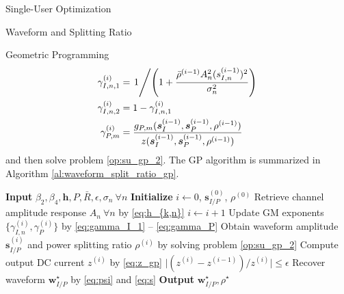 \documentclass{IEEEtran}
\begin{document}
\begin{section}{Single-User Optimization}
\begin{subsection}{Waveform and Splitting Ratio}
\begin{subsubsection}{Geometric Programming}
			\begin{align}
				\gamma_{I,n,1}^{(i)} & = \left. 1 \middle/ \left(1+\frac{\bar{\rho}^{(i-1)}{A_n^2}(s_{I,n}^{(i-1)})^2}{\sigma_n^2}\right) \right.\label{eq:gamma_I_1}\\
				\gamma_{I,n,2}^{(i)} & = 1 - \gamma_{I,n,1}^{(i)}\label{eq:gamma_I_2}\\
				\gamma_{P,m}^{(i)} & =\frac{g_{P,m}(\boldsymbol{s}_I^{(i-1)},\boldsymbol{s}_P^{(i-1)},\rho^{(i-1)})}{z(\boldsymbol{s}_I^{(i-1)},\boldsymbol{s}_P^{(i-1)},\rho^{(i-1)})}\label{eq:gamma_P}
			\end{align}
			and then solve problem \ref{op:su_gp_2}. The GP algorithm is summarized in Algorithm \ref{al:waveform_split_ratio_gp}.
			\begin{algorithm}
				\caption{GP: Waveform and Splitting Ratio}
				\label{al:waveform_split_ratio_gp}
				\begin{algorithmic}[1]
					\State \textbf{Input} $\beta_2,\beta_4,\boldsymbol{h},P,\bar{R},\epsilon,\sigma_n \ \forall n$
					\State \textbf{Initialize} $i \gets 0$, $\boldsymbol{s}_{I/P}^{(0)}$, $\rho^{(0)}$
					\State Retrieve channel amplitude response $A_n \ \forall n$ by \ref{eq:h_{k,n}}
					\Repeat
					\State $i \gets i + 1$
					\State Update GM exponents $\{\gamma_{I,n}^{(i)},\gamma_{P}^{(i)}\}$ by \ref{eq:gamma_I_1} -- \ref{eq:gamma_P}
					\State Obtain waveform amplitude $\boldsymbol{s}_{I/P}^{(i)}$ and power splitting ratio $\rho^{(i)}$ by solving problem \ref{op:su_gp_2}
					\State Compute output DC current $z^{(i)}$ by \ref{eq:z_gp}
					\Until $\lvert (z^{(i)} - z^{(i-1)}) / z^{(i)} \rvert \le \epsilon$
					\State Recover waveform $\boldsymbol{w}_{I/P}^{\star}$ by \ref{eq:psi} and \ref{eq:s}
					\State \textbf{Output} $\boldsymbol{w}_{I/P}^{\star}, \rho^{\star}$
				\end{algorithmic}
			\end{algorithm}
		\end{subsubsection}


\end{subsection}
\end{section}
\end{document}
